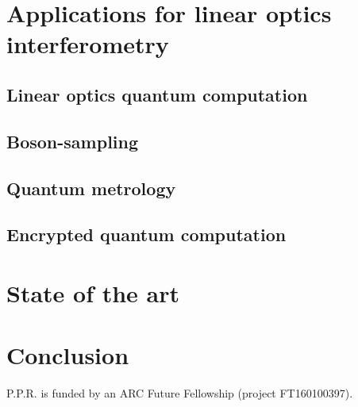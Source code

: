 \documentclass[aps,rmp,twocolumn,amsmath,amssymb,nofootinbib,superscriptaddress]{revtex4}
\newcommand{\comment}[1]{{\color{blue}{#1}}}
\begin{document}
\section{Applications for linear optics interferometry}

\subsection{Linear optics quantum computation}

\subsection{Boson-sampling}

\subsection{Quantum metrology}

\comment{Discuss NOON states - Heisenberg limited}

\comment{Discuss MORDOR scheme}

\subsection{Encrypted quantum computation}

\section{State of the art}

\comment{Discuss where experiments are at at the moment}

\section{Conclusion}

%
%

\begin{acknowledgments}
P.P.R. is funded by an ARC Future Fellowship (project FT160100397).
\end{acknowledgments}

%
%


\end{document}
